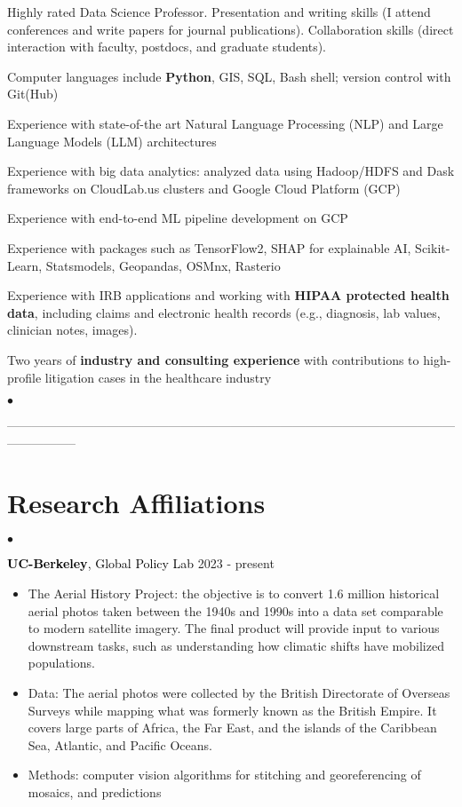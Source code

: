 \documentclass[margin,line]{res}                          %
\newenvironment{list2}{
  \begin{list}{$\bullet$}{%
      \setlength{\itemsep}{0in}
      \setlength{\parsep}{0in} \setlength{\parskip}{0in}
      \setlength{\topsep}{0in} \setlength{\partopsep}{0in} 
      \setlength{\leftmargin}{0.2in}}}{\end{list}}
\begin{document}
\begin{resume}
\begin{outline}
\1 Highly rated Data Science Professor. Presentation and writing skills (I attend conferences and write papers for journal publications). Collaboration skills (direct interaction with faculty, postdocs, and graduate students).

\1 Computer languages include \textbf{Python}, GIS, SQL, Bash shell; version control with Git(Hub)

\1 Experience with state-of-the art Natural Language Processing (NLP) and Large Language Models (LLM) architectures

\1 Experience with big data analytics: analyzed data using Hadoop/HDFS and Dask frameworks on CloudLab.us clusters and Google Cloud Platform (GCP)

\1 Experience with end-to-end ML pipeline development on GCP

\1 Experience with packages such as TensorFlow2, SHAP for explainable AI, Scikit-Learn, Statsmodels, Geopandas, OSMnx, Rasterio

\1 Experience with IRB applications and working with \textbf{HIPAA protected health data}, including claims and electronic health records (e.g., diagnosis, lab values, clinician notes, images).

\1 Two years of \textbf{industry and consulting experience} with contributions to high-profile litigation cases in the healthcare industry

\end{outline}

\begin{list2}
\item[] -----------------------------------------------------------------------------------------------------------------------------
\end{list2}


\section{\sc Research Affiliations}
\begin{list2}
\item[] \textcolor{Black}{\textbf{UC-Berkeley}, Global Policy Lab} \hspace{7.2cm}2023 - present

\begin{itemize}
\item The Aerial History Project: the objective is to convert 1.6 million historical aerial photos taken between the 1940s and 1990s into a data set comparable to modern satellite imagery. The final product will provide input to various downstream tasks, such as understanding how climatic shifts have mobilized populations.
\item Data: The aerial photos were collected by the British Directorate of Overseas Surveys while mapping what was formerly known as the British Empire. It covers large parts of Africa, the Far East, and the islands of the Caribbean Sea, Atlantic, and Pacific Oceans.
\item Methods: computer vision algorithms for stitching and georeferencing of mosaics, and predictions
\end{itemize}
\item[]



\end{list2}
\end{resume}
\end{document}
